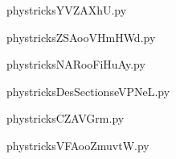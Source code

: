 
    \newcommand{\CaptionFigYVZAXhU}{<+Type your caption here+>}
    \begin{center}
        
    \end{center}
    phystricksYVZAXhU.py

    

    \clearpage
    


    \newcommand{\CaptionFigZSAooVHmHWd}{<+Type your caption here+>}
    \begin{center}
        
    \end{center}
    phystricksZSAooVHmHWd.py

    

    \clearpage
    


    \newcommand{\CaptionFigNARooFiHuAy}{<+Type your caption here+>}
    \begin{center}
        
    \end{center}
    phystricksNARooFiHuAy.py

    

    \clearpage
    


    \newcommand{\CaptionFigDesSectionseVPNeL}{<+Type your caption here+>}
    \begin{center}
        
    \end{center}
    phystricksDesSectionseVPNeL.py

    

    \clearpage
    


    \newcommand{\CaptionFigCZAVGrm}{<+Type your caption here+>}
    \begin{center}
        
    \end{center}
    phystricksCZAVGrm.py

    

    \clearpage
    


    \newcommand{\CaptionFigVFAooZmuvtW}{<+Type your caption here+>}
    \begin{center}
        
    \end{center}
    phystricksVFAooZmuvtW.py

